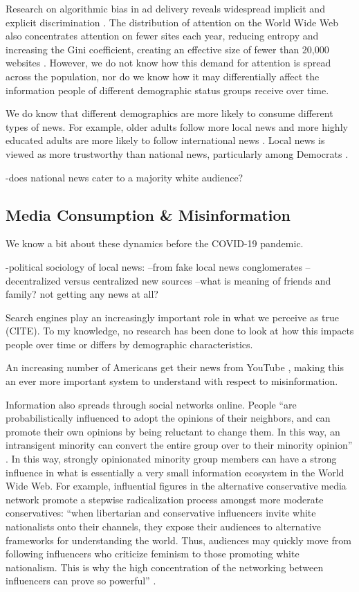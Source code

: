 \documentclass[11pt]{article}
\begin{document}
Research on algorithmic bias in ad delivery reveals widespread implicit and
explicit discrimination \citep{Sweeney2013}. The distribution of attention on
the World Wide Web also concentrates attention on fewer sites each year,
reducing entropy and increasing the Gini coefficient, creating an effective size
of fewer than 20,000 websites \citep{McCurley2007}. However, we do not know how
this demand for attention is spread across the population, nor do we know how it
may differentially affect the information people of different demographic status
groups receive over time.


We do know that different demographics are more likely to consume different types of news. For example, older adults follow more local news and more highly educated adults are more likely to follow international news \citep{Mitchell2018}. Local news is viewed as more trustworthy than national news, particularly among Democrats \citep{KnightGallup2019}.

-does national news cater to a majority white audience?


\subsection{Media Consumption \& Misinformation}

We know a bit about these dynamics before the COVID-19 pandemic.

-political sociology of local news:
--from fake local news conglomerates
--decentralized versus centralized new sources
--what is meaning of friends and family? not getting any news at all?

Search engines play an increasingly important role in what we perceive as true (CITE). To my knowledge, no research has been done to look at how this impacts people over time or differs by demographic characteristics.

An increasing number of Americans get their news from YouTube
\cite{Shearer2017}, making this an ever more important system to understand with
respect to misinformation.

Information also spreads through social networks online. People ``are probabilistically influenced to adopt the opinions of their neighbors, and can promote their own opinions by being reluctant to change them. In this way, an intransigent minority can convert the entire group over to their minority opinion'' \citep{West2011}. In this way, strongly opinionated minority group members can have a strong influence in what is essentially a very small information ecosystem in the World Wide Web. For example, influential figures in the alternative conservative media network promote a stepwise radicalization process amongst more moderate conservatives: ``when libertarian and conservative influencers invite white nationalists onto their channels, they expose their audiences to alternative frameworks for understanding the world. Thus, audiences may quickly move from following influencers who criticize feminism to those promoting white nationalism. This is why the high concentration of the networking between influencers can prove so powerful'' \citep{Lewis}.
\end{document}
